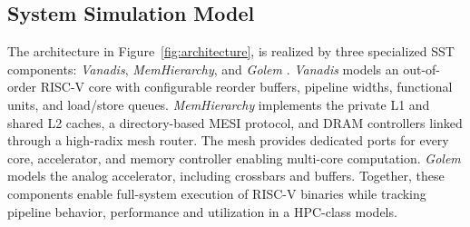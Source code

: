 \subsection{System Simulation Model}
The architecture in Figure~\ref{fig:architecture}, is realized by three specialized SST components: \textit{Vanadis}, \textit{MemHierarchy}, and \textit{Golem} .
\textit{Vanadis} models an out-of-order RISC-V core with configurable reorder buffers, pipeline widths, functional units, and load/store queues.
\textit{MemHierarchy} implements the private L1 and shared L2 caches, a directory-based MESI protocol, and DRAM controllers linked through a high-radix mesh router.
The mesh provides dedicated ports for every core, accelerator, and memory controller enabling multi-core computation. 
\textit{Golem} models the analog accelerator, including crossbars and buffers.
Together, these components enable full-system execution of RISC-V binaries while tracking pipeline behavior, performance and utilization in a HPC-class models.


